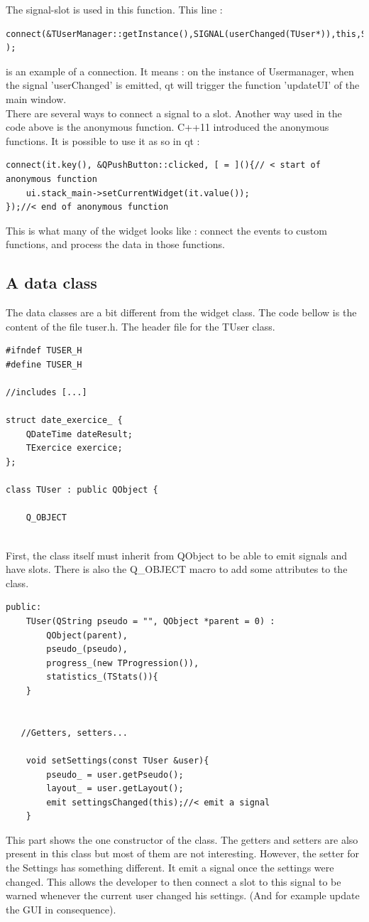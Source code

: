 The signal-slot is used in this function. This line : 
\begin{lstlisting}
connect(&TUserManager::getInstance(),SIGNAL(userChanged(TUser*)),this,SLOT(updateUI(TUser*)) );
\end{lstlisting}
is an example of a connection. It means : on the instance of Usermanager, when the signal 'userChanged' is emitted, qt will trigger the function 'updateUI' of the main window.\\
There are several ways to connect a signal to a slot. Another way used in the code above is the anonymous function. C++11 introduced the anonymous functions. It is possible to use it as so in qt :
\begin{lstlisting}
connect(it.key(), &QPushButton::clicked, [ = ](){// < start of anonymous function
	ui.stack_main->setCurrentWidget(it.value());
});//< end of anonymous function
\end{lstlisting}

This is what many of the widget looks like : connect the events to custom functions, and process the data in those functions.

\subsection{A data class}

The data classes are a bit different from the widget class. The code bellow is the content of the file tuser.h. The header file for the TUser class.
\begin{lstlisting}
#ifndef TUSER_H
#define TUSER_H

//includes [...]

struct date_exercice_ {
    QDateTime dateResult;
    TExercice exercice;
};

class TUser : public QObject {

    Q_OBJECT
    
\end{lstlisting}
First, the class itself must inherit from QObject to be able to emit signals and have slots. There is also the Q\_OBJECT macro to add some attributes to the class.

\begin{lstlisting}
public:
    TUser(QString pseudo = "", QObject *parent = 0) :
        QObject(parent),
        pseudo_(pseudo),
        progress_(new TProgression()),
        statistics_(TStats()){
    }


   //Getters, setters...

    void setSettings(const TUser &user){
        pseudo_ = user.getPseudo();
        layout_ = user.getLayout();
        emit settingsChanged(this);//< emit a signal
    }
\end{lstlisting}
This part shows the one constructor of the class. The getters and setters are also present in this class but most of them are not interesting. However, the setter for the Settings has something different. It emit a signal once the settings were changed. This allows the developer to then connect a slot to this signal to be warned whenever the current user changed his settings. (And for example update the GUI in consequence).


